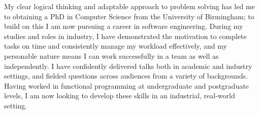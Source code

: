 
\vspace*{\fill}
\hspace{-2.5em}
\begin{minipage}{\sidewidth+0.5\margin}
  \begin{center}

    \vspace{1.5em}


    \vspace{1em}

    My clear logical thinking and adaptable approach to problem solving has
    led me to obtaining a PhD in Computer Science from the University of
    Birmingham; to build on this I am now pursuing a career in software
    engineering.
    During my studies and roles in industry, I have demonstrated the
    motivation to complete tasks on time and consistently manage my
    workload effectively, and my personable nature means I can work
    successfully in a team as well as independently.
    I have confidently delivered talks both in academic and industry settings,
    and fielded questions across audiences from a variety of backgrounds.
    Having worked in functional programming at undergraduate
    and postgraduate levels, I am now looking to develop these skills
    in an industrial, real-world setting.

    \vspace{1.5em}


    \vspace{1em}



\end{center}
\end{minipage}
